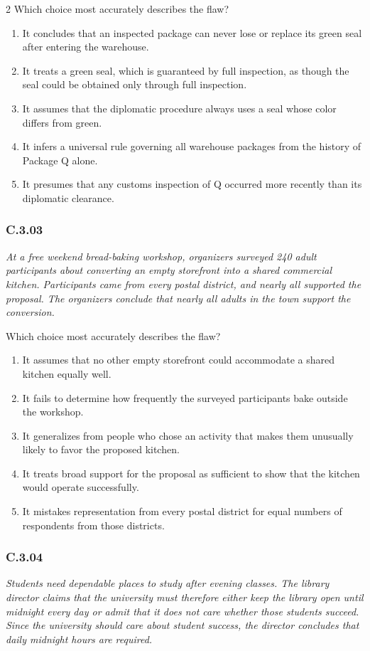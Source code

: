 \documentclass[10pt]{extarticle}
\newcommand{\choice}[1]{\item #1}
\newcommand{\bankitem}[1]{\subsubsection*{#1}}
\begin{document}
\begin{multicols}{2}
Which choice most accurately describes the flaw?
\begin{enumerate}[label=(\alph*)]
  \choice{It concludes that an inspected package can never lose or replace its green seal after entering the warehouse.}
  \choice{It treats a green seal, which is guaranteed by full inspection, as though the seal could be obtained only through full inspection.}
  \choice{It assumes that the diplomatic procedure always uses a seal whose color differs from green.}
  \choice{It infers a universal rule governing all warehouse packages from the history of Package Q alone.}
  \choice{It presumes that any customs inspection of Q occurred more recently than its diplomatic clearance.}
\end{enumerate}
\bankitem{C.3.03}
\emph{At a free weekend bread-baking workshop, organizers surveyed 240 adult participants about converting an empty storefront into a shared commercial kitchen. Participants came from every postal district, and nearly all supported the proposal. The organizers conclude that nearly all adults in the town support the conversion.}

Which choice most accurately describes the flaw?
\begin{enumerate}[label=(\alph*)]
  \choice{It assumes that no other empty storefront could accommodate a shared kitchen equally well.}
  \choice{It fails to determine how frequently the surveyed participants bake outside the workshop.}
  \choice{It generalizes from people who chose an activity that makes them unusually likely to favor the proposed kitchen.}
  \choice{It treats broad support for the proposal as sufficient to show that the kitchen would operate successfully.}
  \choice{It mistakes representation from every postal district for equal numbers of respondents from those districts.}
\end{enumerate}
\bankitem{C.3.04}
\emph{Students need dependable places to study after evening classes. The library director claims that the university must therefore either keep the library open until midnight every day or admit that it does not care whether those students succeed. Since the university should care about student success, the director concludes that daily midnight hours are required.}


\end{multicols}
\end{document}
